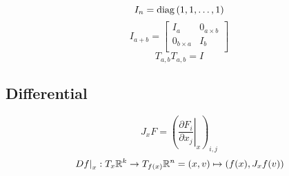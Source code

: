 \documentclass[../main.tex]{subfiles}
\begin{document}
\begin{equation}\label{Matrix:Identity:Value}
I_n=\operatorname{diag}{\left(1,1,\dots,1\right)}
\end{equation}
\begin{equation}\label{Matrix:Identity:Block}
I_{a+b}=
\begin{bmatrix}
I_a&0_{a\times b} \\
0_{b\times a}&I_b           \\
\end{bmatrix}
\end{equation}
\begin{equation}\label{Matrix:Permutation:Square}
T_{a,b} T_{a,b}= I
\end{equation}
\subsection{Differential}
\begin{equation}
J_xF = \left(\left.\frac{\partial F_i}{\partial x_j}\right|_x\right)_{i,j}
\end{equation}
\begin{equation}
\left.Df\right|_x
: T_x\mathbb{R}^k\to T_{f(x)}\mathbb{R}^n
= \left(x,v\right) \mapsto \left(f(x),J_xf(v)\right)
\end{equation}
\end{document}
